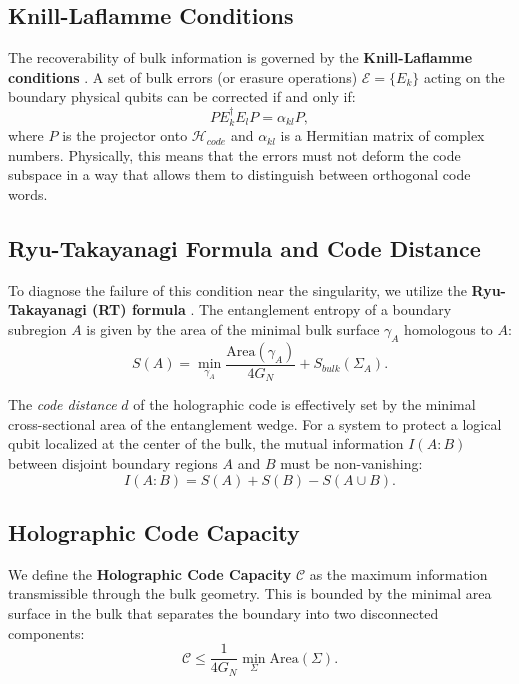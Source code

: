 \documentclass[aps,prd,reprint,nofootinbib,amsmath,amssymb,amsfonts]{revtex4-2}
\begin{document}
\subsection{Knill-Laflamme Conditions}

The recoverability of bulk information is governed by the \textbf{Knill-Laflamme conditions} \cite{KnillLaflamme1997}. A set of bulk errors (or erasure operations) $\mathcal{E} = \{E_k\}$ acting on the boundary physical qubits can be corrected if and only if:
\begin{equation}
    P E_k^\dagger E_l P = \alpha_{kl} P,
    \label{eq:knill_laflamme}
\end{equation}
where $P$ is the projector onto $\mathcal{H}_{code}$ and $\alpha_{kl}$ is a Hermitian matrix of complex numbers. Physically, this means that the errors must not deform the code subspace in a way that allows them to distinguish between orthogonal code words.

\subsection{Ryu-Takayanagi Formula and Code Distance}

To diagnose the failure of this condition near the singularity, we utilize the \textbf{Ryu-Takayanagi (RT) formula} \cite{Ryu2006}. The entanglement entropy of a boundary subregion $A$ is given by the area of the minimal bulk surface $\gamma_A$ homologous to $A$:
\begin{equation}
    S(A) = \min_{\gamma_A} \frac{\text{Area}(\gamma_A)}{4G_N} + S_{bulk}(\Sigma_A).
    \label{eq:RT_formula}
\end{equation}

The \textit{code distance} $d$ of the holographic code is effectively set by the minimal cross-sectional area of the entanglement wedge. For a system to protect a logical qubit localized at the center of the bulk, the mutual information $I(A:B)$ between disjoint boundary regions $A$ and $B$ must be non-vanishing:
\begin{equation}
    I(A:B) = S(A) + S(B) - S(A \cup B).
\end{equation}

\subsection{Holographic Code Capacity}

We define the \textbf{Holographic Code Capacity} $\mathcal{C}$ as the maximum information transmissible through the bulk geometry. This is bounded by the minimal area surface in the bulk that separates the boundary into two disconnected components:
\begin{equation}
    \mathcal{C} \le \frac{1}{4G_N} \min_{\Sigma} \text{Area}(\Sigma).
    \label{eq:code_capacity}
\end{equation}
\end{document}
